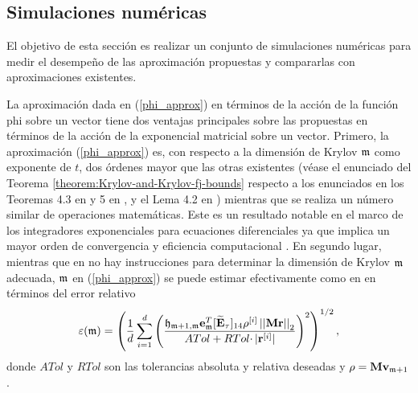 \subsection{Simulaciones numéricas}\label{section:num-sim-kp}
El objetivo de esta sección es realizar un conjunto de simulaciones numéricas para medir el desempeño de las aproximación propuestas y compararlas con aproximaciones existentes.

La aproximación dada en (\ref{phi_approx}) en términos de la acción de la función phi sobre un vector tiene dos ventajas principales sobre las propuestas \cite{hochbruck1997krylov,sidje1998expokit,jimenez2012convergence}
en términos de la acción de la exponencial matricial sobre un vector. Primero, la aproximación (\ref{phi_approx}) es, con respecto a la dimensión de Krylov $\mathfrak{m}$ como exponente de $t$, dos órdenes mayor que las otras existentes (véase el enunciado del Teorema \ref{theorem:Krylov-and-Krylov-fj-bounds} respecto a los enunciados en los Teoremas 4.3 en \cite{Saad92} y 5 en \cite{hochbruck1997krylov}, y el Lema 4.2 en \cite{jimenez2012convergence}) mientras que se realiza un número similar de operaciones matemáticas. Este es un resultado notable en el marco de los integradores exponenciales para ecuaciones diferenciales ya que implica un mayor orden de convergencia y eficiencia computacional \cite{naranjo2021locally}. En segundo lugar, mientras que en \cite{hochbruck1997krylov,sidje1998expokit,jimenez2012convergence} no hay instrucciones para determinar la dimensión de Krylov $\mathfrak{m}$ adecuada, $\mathfrak{m}$ en (\ref{phi_approx}) se puede estimar efectivamente como en \cite{naranjo2021locally,naranjo2023jacobian} en términos del error relativo
\begin{equation*}
	\varepsilon(\mathfrak{m}) = \left(\frac{1}{d}\sum\limits_{i=1}^{d} \left(\frac{
		\mathfrak{h}_{\mathfrak{m}+1,\mathfrak{m}} \mathbf{e}_{\mathfrak{m}}^T
		[\widetilde{\mathbf{E}}_\tau]_{14} \rho^{[i]} \left\lvert \left\lvert \mathbf{Mr} \right\rvert \right\rvert_2}{ATol+ RTol\cdotp
		\rvert \mathbf{r}^{[i]}\rvert}\right)^{2}\right)^{1/2},
\end{equation*}
donde $ATol$ y $RTol$ son las tolerancias absoluta y relativa deseadas y $\mathbf{\rho} = \mathbf{M} \mathbf{v}_{\mathfrak{m}+1}$. 

